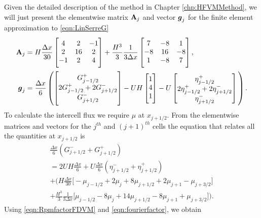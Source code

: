 Given the detailed description of the method in Chapter \ref{chp:HFVMMethod}, we will just present the elementwise matrix $\mathbf{A}_j$ and vector $\boldsymbol{g}_j$ for the finite element approximation to \eqref{eqn:LinSerreG} 
\begin{align*}
\matr{A}_j &= H \frac{\Delta x}{30 } \begin{bmatrix} \TM 4 &2 &-1 \\2 &16 &2  \\-1 &2 &4 \BM \end{bmatrix} +  \frac{H^3 }{3} \frac{1 }{3\Delta x}\begin{bmatrix} \TM 7 &-8 &1  \\-8 &16 &-8  \\1 &-8 &7 \BM \end{bmatrix}, \\
\vecn{g}_j &=  \frac{\Delta x}{6} \left(\begin{bmatrix} \TM G^+_{j -1/2} \\2 G^+_{j -1/2}+2 G^-_{j +1/2} \\ G^-_{j +1/2} \BM \end{bmatrix} - UH\begin{bmatrix} \TM 1 \\4 \\ 1  \BM\end{bmatrix} - U\begin{bmatrix} \TM \eta^+_{j -1/2} \\2 \eta^+_{j -1/2}+2 \eta^-_{j +1/2} \\ \eta^-_{j +1/2} \end{bmatrix} \BM \right).
\end{align*}
To calculate the intercell flux we require $\mu$ at $x_{j+1/2}$. From the elementwise matrices and vectors for the $j^{th}$ and $\left(j+1\right)^{th}$ cells the equation that relates all the quantities at $x_{j+1/2}$ is
\begin{multline*}
\frac{\Delta x}{6} \left(G^-_{j +1/2} + G^+_{j +1/2} \right) \\
=2UH \frac{\Delta x}{6}   + U\frac{\Delta x}{6} \left(\eta^-_{j +1/2} + \eta^+_{j +1/2} \right) \\ +   \Bigg(H\frac{\Delta x}{30} \Bigg[ -\mu_{j-1/2} +  2\mu_{j} + 8\mu_{j+1/2}  +  2 \mu_{j+1}  - \mu_{j+3/2}\Bigg]   \\ + \frac{H^3 }{3}\frac{1 }{3\Delta x} \Bigg[  \mu_{j-1/2} -8\mu_{j} + 14 \mu_{j+1/2} -8\mu_{j+1} + \mu_{j+3/2}  \Bigg]    \Bigg).
\end{multline*}
Using \eqref{eqn:RpmfactorFDVM} and \eqref{eqn:fourierfactor}, we obtain
